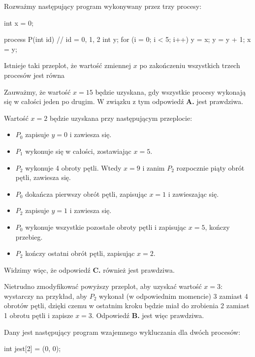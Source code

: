 \begin{solutions}
    \sol Rozważmy następujący program wykonywany przez trzy procesy:
    \begin{cpp}
        int x = 0;

        process P(int id) { // id = 0, 1, 2
            int y;
            for (i = 0; i < 5; i++) {
                y = x;
                y = y + 1;
                x = y;
            }
        }
    \end{cpp}

    Istnieje taki przeplot, że wartość zmiennej $x$ po zakończeniu wszystkich trzech procesów jest równa

    Zauważmy, że wartość $x = 15$ będzie uzyskana, gdy wszystkie procesy wykonają się w całości jeden po drugim. W związku z tym odpowiedź \textbf{A.} jest prawdziwa.

    Wartość $x = 2$ będzie uzyskana przy następującym przeplocie:
    \begin{itemize}
        \item $P_0$ zapisuje $y = 0$ i zawiesza się.
        \item $P_1$ wykonuje się w całości, zostawiając $x = 5$.
        \item $P_2$ wykonuje 4 obroty pętli. Wtedy $x = 9$ i zanim $P_2$ rozpocznie piąty obrót pętli, zawiesza się.
        \item $P_0$ dokańcza pierwszy obrót pętli, zapisując $x = 1$ i zawieszając się.
        \item $P_2$ zapisuje $y = 1$ i zawiesza się.
        \item $P_0$ wykonuje wszystkie pozostałe obroty pętli i zapisując $x = 5$, kończy przebieg.
        \item $P_2$ kończy ostatni obrót pętli, zapisując $x = 2$.
    \end{itemize}
    Widzimy więc, że odpowiedź \textbf{C.} również jest prawdziwa.

    Nietrudno zmodyfikować powyższy przeplot, aby uzyskać wartość $x = 3$: wystarczy na przykład, aby $P_2$ wykonał (w odpowiednim momencie) 3 zamiast 4 obrotów pętli, dzięki czemu w ostatnim kroku będzie miał do zrobienia 2 zamiast 1 obrotu pętli i zapisze $x = 3$. Odpowiedź \textbf{B.} jest więc prawdziwa.

    \sol Dany jest następujący program wzajemnego wykluczania dla dwóch procesów:
    \begin{cpp}
        int jest[2] = (0, 0);
        

\end{cpp}
\end{solutions}
